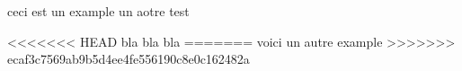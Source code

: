 \beguindocument
ceci est un example
un aotre test

<<<<<<< HEAD
bla bla bla
=======
voici un autre example
>>>>>>> ecaf3c7569ab9b5d4ee4fe556190c8e0c162482a
